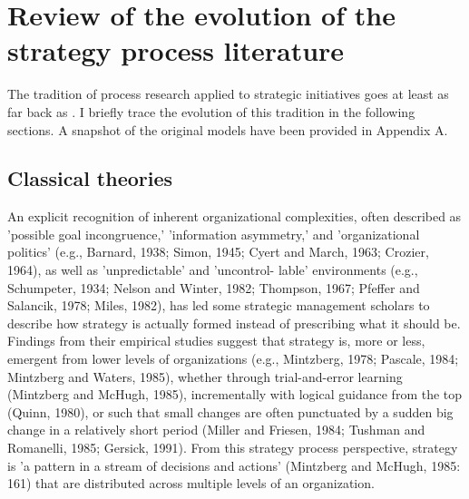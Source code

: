 \documentclass[12pt,letterpaper]{article}
\begin{document}
\section{Review of the evolution of the strategy process literature}
The tradition of process research applied to strategic initiatives goes at least as far back as \cite{Bower1970}. I briefly trace the evolution of this tradition in the following sections. A snapshot of the original models have been provided in Appendix A.

\subsection{Classical theories}
\cite{Noda1996} An explicit recognition of inherent organizational complexities, often described as 'possible goal incongruence,' 'information asymmetry,' and 'organizational politics' (e.g., Barnard, 1938; Simon, 1945; Cyert and March, 1963; Crozier, 1964), as well as 'unpredictable' and 'uncontrol- lable' environments (e.g., Schumpeter, 1934; Nelson and Winter, 1982; Thompson, 1967; Pfeffer and Salancik, 1978; Miles, 1982), has led some strategic management scholars to describe how strategy is actually formed instead of prescribing what it should be. Findings from their empirical studies suggest that strategy is, more or less, emergent from lower levels of organizations (e.g., Mintzberg, 1978; Pascale, 1984; Mintzberg and Waters, 1985), whether through trial-and-error learning (Mintzberg and McHugh, 1985), incrementally with logical guidance from the top (Quinn, 1980), or such that small changes are often punctuated by a sudden big change in a relatively short period (Miller and Friesen, 1984; Tushman and Romanelli, 1985; Gersick, 1991). From this strategy process perspective, strategy is 'a pattern in a stream of decisions and actions' (Mintzberg and McHugh, 1985: 161) that are distributed across multiple levels of an organization.
\end{document}
